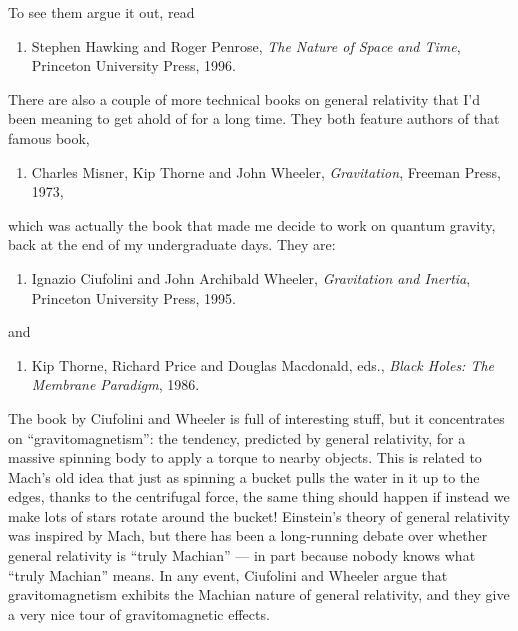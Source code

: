 \documentclass{article}
\def\tightlist{}
\begin{document}
To see them argue it out, read

\begin{enumerate}
\def\labelenumi{\arabic{enumi})}
\setcounter{enumi}{1}
\tightlist
\item
  Stephen Hawking and Roger Penrose, \emph{The Nature of Space and
  Time}, Princeton University Press, 1996.
\end{enumerate}

There are also a couple of more technical books on general relativity
that I'd been meaning to get ahold of for a long time. They both feature
authors of that famous book,

\begin{enumerate}
\def\labelenumi{\arabic{enumi})}
\setcounter{enumi}{2}
\tightlist
\item
  Charles Misner, Kip Thorne and John Wheeler, \emph{Gravitation},
  Freeman Press, 1973,
\end{enumerate}

which was actually the book that made me decide to work on quantum
gravity, back at the end of my undergraduate days. They are:

\begin{enumerate}
\def\labelenumi{\arabic{enumi})}
\setcounter{enumi}{3}
\tightlist
\item
  Ignazio Ciufolini and John Archibald Wheeler, \emph{Gravitation and
  Inertia}, Princeton University Press, 1995.
\end{enumerate}

and

\begin{enumerate}
\def\labelenumi{\arabic{enumi})}
\setcounter{enumi}{4}
\tightlist
\item
  Kip Thorne, Richard Price and Douglas Macdonald, eds., \emph{Black
  Holes: The Membrane Paradigm}, 1986.
\end{enumerate}

The book by Ciufolini and Wheeler is full of interesting stuff, but it
concentrates on ``gravitomagnetism'': the tendency, predicted by general
relativity, for a massive spinning body to apply a torque to nearby
objects. This is related to Mach's old idea that just as spinning a
bucket pulls the water in it up to the edges, thanks to the centrifugal
force, the same thing should happen if instead we make lots of stars
rotate around the bucket! Einstein's theory of general relativity was
inspired by Mach, but there has been a long-running debate over whether
general relativity is ``truly Machian'' --- in part because nobody knows
what ``truly Machian'' means. In any event, Ciufolini and Wheeler argue
that gravitomagnetism exhibits the Machian nature of general relativity,
and they give a very nice tour of gravitomagnetic effects.
\end{document}
